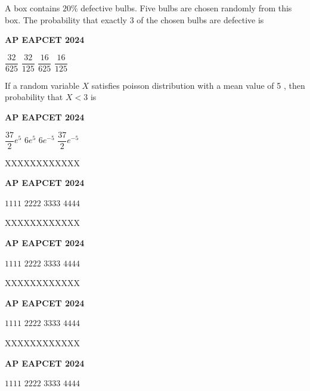\documentclass[11pt,paper=a4,answers]{exam}
\begin{document}
\begin{multicols}{2}
\begin{questions}
\question
A box contains $20 \%$ defective bulbs. Five bulbs are chosen randomly from this box. The probability that exactly 3 of the chosen bulbs are defective is
\begin{flushright}
\small\textbf{AP EAPCET 2024}
\end{flushright}
\begin{choices}
  \choice $\dfrac{32}{625}$
  \choice $\dfrac{32}{125}$
  \choice $\dfrac{16}{625}$
  \choice $\dfrac{16}{125}$
\end{choices}


\question
If a random variable $X$ satisfies poisson distribution with a mean value of 5 , then probability that $X<3$ is
\begin{flushright}
\small\textbf{AP EAPCET 2024}
\end{flushright}
\begin{choices}
  \choice $\dfrac{37}{2} e^5$
  \choice $6 e^5$ 
  \choice $6 e^{-5}$ 
  \choice $\dfrac{37}{2} e^{-5}$
\end{choices}


\question
XXXXXXXXXXXX
\begin{flushright}
\small\textbf{AP EAPCET 2024}
\end{flushright}
\begin{choices}
  \choice $1111$
  \choice $2222$ 
  \choice $3333$ 
  \choice $4444$
\end{choices}

\question
XXXXXXXXXXXX
\begin{flushright}
\small\textbf{AP EAPCET 2024}
\end{flushright}
\begin{choices}
  \choice $1111$
  \choice $2222$ 
  \choice $3333$ 
  \choice $4444$
\end{choices}

\question
XXXXXXXXXXXX
\begin{flushright}
\small\textbf{AP EAPCET 2024}
\end{flushright}
\begin{choices}
  \choice $1111$
  \choice $2222$ 
  \choice $3333$ 
  \choice $4444$
\end{choices}

\question
XXXXXXXXXXXX
\begin{flushright}
\small\textbf{AP EAPCET 2024}
\end{flushright}
\begin{choices}
  \choice $1111$
  \choice $2222$ 
  \choice $3333$ 
  \choice $4444$
\end{choices}


\end{questions}
\end{multicols}
\end{document}
